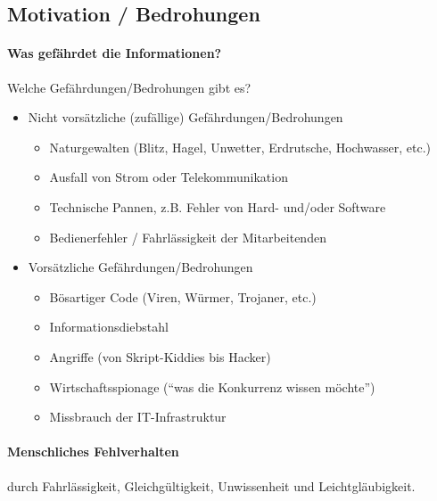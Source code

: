 \documentclass[10pt,a4paper]{article}
\begin{document}
\subsection*{Motivation / Bedrohungen}

\paragraph*{Was gefährdet die Informationen?} Welche Gefährdungen/Bedrohungen gibt es?
\begin{itemize}[noitemsep,topsep=0pt,leftmargin=*]
    \item Nicht vorsätzliche (zufällige) Gefährdungen/Bedrohungen
    \begin{itemize}[noitemsep,topsep=0pt,leftmargin=*]
        \item Naturgewalten (Blitz, Hagel, Unwetter, Erdrutsche, Hochwasser, etc.)
        \item Ausfall von Strom oder Telekommunikation
        \item Technische Pannen, z.B. Fehler von Hard- und/oder Software
        \item Bedienerfehler / Fahrlässigkeit der Mitarbeitenden
    \end{itemize}
    \item Vorsätzliche Gefährdungen/Bedrohungen
    \begin{itemize}[noitemsep,topsep=0pt,leftmargin=*]
        \item Bösartiger Code (Viren, Würmer, Trojaner, etc.)
        \item Informationsdiebstahl
        \item Angriffe (von Skript-Kiddies bis Hacker)
        \item Wirtschaftsspionage ("`was die Konkurrenz wissen möchte"')
        \item Missbrauch der IT-Infrastruktur
    \end{itemize}
\end{itemize}

\paragraph*{Menschliches Fehlverhalten}durch Fahrlässigkeit, Gleichgültigkeit, Unwissenheit und Leichtgläubigkeit.
\end{document}
